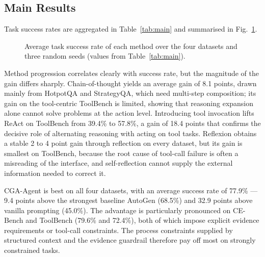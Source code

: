 \documentclass[journal,10pt,a4paper]{IEEEtran}
\begin{document}
\subsection{Main Results}
Task success rates are aggregated in Table~\ref{tab:main} and summarised in Fig.~\ref{fig:sr}.

\begin{figure}[t]
\centering
{}
\caption{Average task success rate of each method over the four datasets and three random seeds (values from Table~\ref{tab:main}).}
\label{fig:sr}
\end{figure}

Method progression correlates clearly with success rate, but the magnitude of the gain differs sharply. Chain-of-thought yields an average gain of 8.1 points, drawn mainly from HotpotQA and StrategyQA, which need multi-step composition; its gain on the tool-centric ToolBench is limited, showing that reasoning expansion alone cannot solve problems at the action level. Introducing tool invocation lifts ReAct on ToolBench from 39.4\% to 57.8\%, a gain of 18.4 points that confirms the decisive role of alternating reasoning with acting on tool tasks. Reflexion obtains a stable 2 to 4 point gain through reflection on every dataset, but its gain is smallest on ToolBench, because the root cause of tool-call failure is often a misreading of the interface, and self-reflection cannot supply the external information needed to correct it.

CGA-Agent is best on all four datasets, with an average success rate of 77.9\% --- 9.4 points above the strongest baseline AutoGen (68.5\%) and 32.9 points above vanilla prompting (45.0\%). The advantage is particularly pronounced on CE-Bench and ToolBench (79.6\% and 72.4\%), both of which impose explicit evidence requirements or tool-call constraints. The process constraints supplied by structured context and the evidence guardrail therefore pay off most on strongly constrained tasks.
\end{document}
